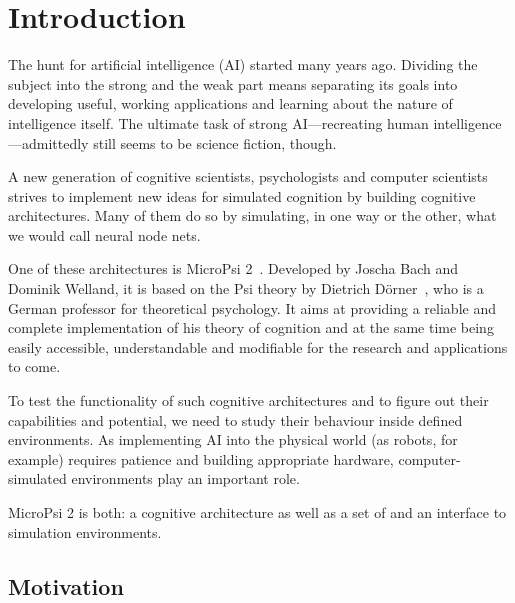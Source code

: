 \chapter{Introduction}
\label{chap:1}


The hunt for artificial intelligence (AI) started many years ago. Dividing the subject into the strong and the weak part means separating its goals into developing useful, working applications and learning about the nature of intelligence itself. The ultimate task of strong AI---recreating human intelligence---admittedly still seems to be science fiction, though.


A new generation of cognitive scientists, psychologists and computer scientists strives to implement new ideas for simulated cognition by building cognitive architectures. Many of them do so by simulating, in one way or the other, what we would call neural node nets.

One of these architectures is MicroPsi 2~\cite{conf/agi/Bach12}. Developed by Joscha Bach and Dominik Welland, it is based on the Psi theory by Dietrich Dörner~\cite{Doerner98}, who is a German professor for theoretical psychology. It aims at providing a reliable and complete implementation of his theory of cognition and at the same time being easily accessible, understandable and modifiable for the research and applications to come.

To test the functionality of such cognitive architectures and to figure out their capabilities and potential, we need to study their behaviour inside defined environments. As implementing AI into the physical world (as robots, for example) requires patience and building appropriate hardware, computer-simulated environments play an important role.

MicroPsi 2 is both: a cognitive architecture as well as a set of and an interface to simulation environments.

\section{Motivation}


